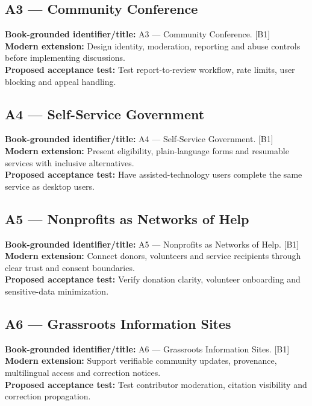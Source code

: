 \documentclass[11pt]{article}
\begin{document}
\subsection{A3 — Community Conference}
\noindent\textcolor{Ocean}{\textbf{Book-grounded identifier/title:}} A3 — Community Conference. [B1]\\
\textcolor{Mint}{\textbf{Modern extension:}} Design identity, moderation, reporting and abuse controls before implementing discussions.\\
\textcolor{Amber}{\textbf{Proposed acceptance test:}} Test report-to-review workflow, rate limits, user blocking and appeal handling.\medskip
\subsection{A4 — Self-Service Government}
\noindent\textcolor{Ocean}{\textbf{Book-grounded identifier/title:}} A4 — Self-Service Government. [B1]\\
\textcolor{Mint}{\textbf{Modern extension:}} Present eligibility, plain-language forms and resumable services with inclusive alternatives.\\
\textcolor{Amber}{\textbf{Proposed acceptance test:}} Have assisted-technology users complete the same service as desktop users.\medskip
\subsection{A5 — Nonprofits as Networks of Help}
\noindent\textcolor{Ocean}{\textbf{Book-grounded identifier/title:}} A5 — Nonprofits as Networks of Help. [B1]\\
\textcolor{Mint}{\textbf{Modern extension:}} Connect donors, volunteers and service recipients through clear trust and consent boundaries.\\
\textcolor{Amber}{\textbf{Proposed acceptance test:}} Verify donation clarity, volunteer onboarding and sensitive-data minimization.\medskip
\subsection{A6 — Grassroots Information Sites}
\noindent\textcolor{Ocean}{\textbf{Book-grounded identifier/title:}} A6 — Grassroots Information Sites. [B1]\\
\textcolor{Mint}{\textbf{Modern extension:}} Support verifiable community updates, provenance, multilingual access and correction notices.\\
\textcolor{Amber}{\textbf{Proposed acceptance test:}} Test contributor moderation, citation visibility and correction propagation.\medskip
\end{document}
